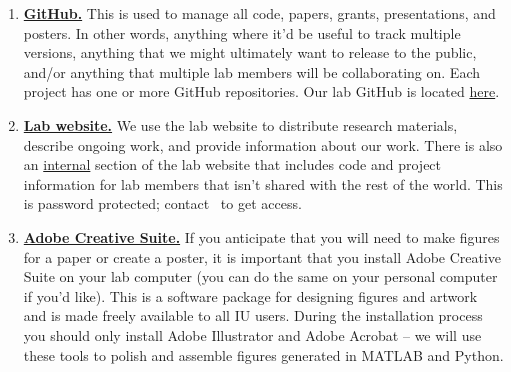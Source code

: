 \documentclass{tufte-book} %
\begin{document}
\begin{enumerate}

\item \href{https://www.github.com}{\textbf{GitHub.}} This is used to manage all code, papers, grants, presentations, and posters. In other words, anything where it'd be useful to track multiple versions, anything that we might ultimately want to release to the public, and/or anything that multiple lab members will be collaborating on. Each project has one or more GitHub repositories. Our lab GitHub is located \href{https://github.com/brain-networks}{here}.
 

 

\item \href{https://www.brainnetworkslab.com}{\textbf{Lab website.}}  We use the lab website to distribute research materials, describe ongoing work, and provide information about our work. There is also an \href{https://www.brainnetworkslab.com/internal}{internal} section of the lab website that includes code and project information for lab members that isn't shared with the rest of the world. This is password protected; contact \director~to get access.
 
\item \href{https://kb.iu.edu/d/bdfy}{\textbf{Adobe Creative Suite.}} If you anticipate that you will need to make figures for a paper or create a poster, it is important that you install Adobe Creative Suite on your lab computer (you can do the same on your personal computer if you'd like). This is a software package for designing figures and artwork and is made freely available to all IU users. During the installation process you should only install Adobe Illustrator and Adobe Acrobat -- we will use these tools to polish and assemble figures generated in MATLAB and Python.
 
\end{enumerate}
\end{document}
